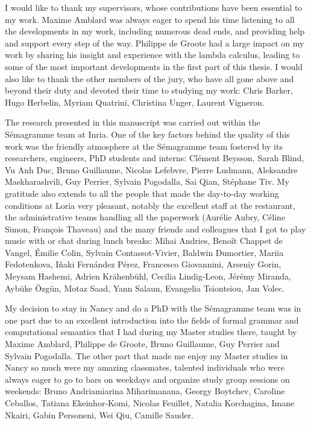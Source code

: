 I would like to thank my supervisors, whose contributions have been essential to
my work. Maxime Amblard was always eager to spend his time listening to all the
developments in my work, including numerous dead ends, and providing help and
support every step of the way. Philippe de Groote had a large impact on my work
by sharing his insight and experience with the lambda calculus, leading to some
of the most important developments in the first part of this thesis. I would
also like to thank the other members of the jury, who have all gone above and
beyond their duty and devoted their time to studying my work: Chris Barker, Hugo
Herbelin, Myriam Quatrini, Christina Unger, Laurent Vigneron.

The research presented in this manuscript was carried out within the Sémagramme
team at Inria. One of the key factors behind the quality of this work was the
friendly atmosphere at the Sémagramme team fostered by its researchers,
engineers, PhD students and interns: Clément Beysson, Sarah Blind, Vu Anh Duc,
Bruno Guillaume, Nicolas Lefebvre, Pierre Ludmann, Aleksandre Maskharashvili,
Guy Perrier, Sylvain Pogodalla, Sai Qian, Stéphane Tiv. My gratitude also
extends to all the people that made the day-to-day working conditions at Loria
very pleasant, notably the excellent staff at the restaurant, the administrative
teams handling all the paperwork (Aurélie Aubry, Céline Simon, François Thaveau)
and the many friends and colleagues that I got to play music with or chat during
lunch breaks: Mihai Andries, Benoît Chappet de Vangel, Émilie Colin, Sylvain
Contassot-Vivier, Baldwin Dumortier, Mariia Fedotenkova, Iñaki Fernández Pérez,
Francesco Giovannini, Arseniy Gorin, Meysam Hashemi, Adrien Krähenbühl, Cecilia
Lindig-Leon, Jérémy Miranda, Aybüke Özgün, Motaz Saad, Yann Salaun, Evangelia
Tsiontsiou, Jan Volec.

My decision to stay in Nancy and do a PhD with the Sémagramme team was in one
part due to an excellent introduction into the fields of formal grammar and
computational semantics that I had during my Master studies there, taught by
Maxime Amblard, Philippe de Groote, Bruno Guillaume, Guy Perrier and Sylvain
Pogodalla. The other part that made me enjoy my Master studies in Nancy so much
were my amazing classmates, talented individuals who were always eager to go to
bars on weekdays and organize study group sessions on weekends: Bruno
Andriamiarina Miharimanana, Georgy Boytchev, Caroline Ceballos, Tatiana
Ekeinhor-Komi, Nicolas Feuillet, Natalia Korchagina, Imane Nkairi, Gabin
Personeni, Wei Qiu, Camille Sauder.

